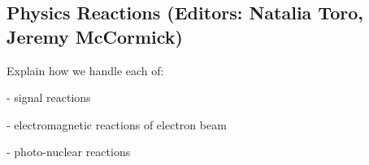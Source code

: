 
\subsection{Physics Reactions (Editors: Natalia Toro, Jeremy McCormick)}

Explain how we handle each of: 

- signal reactions

- electromagnetic reactions of electron beam

- photo-nuclear reactions

